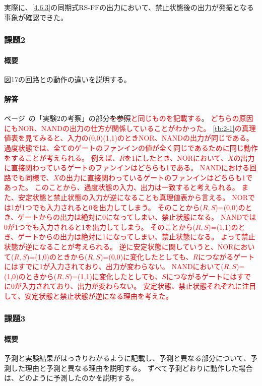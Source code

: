 \documentclass[dvipdfmx]{jsarticle}
\newcommand{\Add}[1]{\textcolor{red}{#1}}
\newcommand{\Erase}[1]{\textcolor{red}{\sout{\textcolor{black}{#1}}}}
\begin{document}
実際に、\ref*{4.6.3}の同期式RS-FFの出力において、禁止状態後の出力が発振となる事象が確認できた。

\subsubsection{課題2}

\paragraph{概要}
図17の回路との動作の違いを説明する。

\paragraph{解答}
ページ\pageref*{kousatu2}~の「実験2の考察」の部分\Erase{を参照}\Add{と同じものを記載する}。
\Add{
  どちらの原因にもNOR、NANDの出力の仕方が関係していることがわかった。
\ref*{tb:2-1}の真理値表を見てみると、入力の(0,0)(1,1)のときNOR、NANDの出力が同じである。
過度状態では、全てのゲートのファンインの値が全く同じであるために同じ動作をすることが考えられる。
例えば、$R$を1にしたとき、NORにおいて、$X$の出力に直接関わっているゲートのファンインはどちらも1である。
NANDにおける回路でも同様で、$X$の出力に直接関わっているゲートのファンインはどちらも1であった。
このことから、過度状態の入力、出力は一致すると考えられる。
また、安定状態と禁止状態の入力が逆になることも真理値表から言える。
NORでは1が1つでも入力されると0を出力してしまう。
そのことから($R,S$)=(0,0)のとき、ゲートからの出力は絶対に0になってしまい、禁止状態になる。
NANDでは0が1つでも入力されると1を出力してしまう。
そのことから($R,S$)=(1,1)のとき、ゲートからの出力は絶対に1になってしまい、禁止状態になる。
よって禁止状態が逆になることが考えられる。
逆に安定状態に関していうと、NORにおいて($R,S$)=(1,0)のときから($R,S$)=(0,0)に変化したとしても、$R$につながるゲートにはすでに1が入力されており、出力が変わらない。
NANDにおいて($R,S$)=(1,0)のときから($R,S$)=(1,1)に変化したとしても、$S$につながるゲートにはすでに0が入力されており、出力が変わらない。
安定状態、禁止状態それぞれに注目して、安定状態と禁止状態が逆になる理由を考えた。
}

\subsubsection{課題3}

\paragraph{概要}
予測と実験結果がはっきりわかるように記載し、予測と異なる部分について、予測した理由と予測と異なる理由を説明する。
ずべて予測どおりに動作した場合は、どのように予測したのかを説明する。
\end{document}
